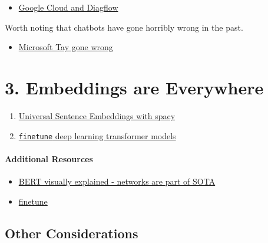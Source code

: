 \documentclass[
]{article}
\providecommand{\tightlist}{%
  \setlength{\itemsep}{0pt}\setlength{\parskip}{0pt}}
\begin{document}
\begin{itemize}
\tightlist
\item
  \href{https://developers.google.com/learn/topics/chatbots}{Google
  Cloud and Diagflow}
\end{itemize}

Worth noting that chatbots have gone horribly wrong in the past.

\begin{itemize}
\tightlist
\item
  \href{https://spectrum.ieee.org/in-2016-microsofts-racist-chatbot-revealed-the-dangers-of-online-conversation}{Microsoft
  Tay gone wrong}
\end{itemize}

\hypertarget{embeddings-are-everywhere}{%
\section{3. Embeddings are Everywhere}\label{embeddings-are-everywhere}}

\begin{enumerate}
\def\labelenumi{\arabic{enumi}.}
\item
  \href{https://colab.research.google.com/drive/1Uvdr09Aitq4IQHTj5Yb-WkoUWE4g_d5X?usp=sharing}{Universal
  Sentence Embeddings with spacy}
\item
  \href{https://colab.research.google.com/drive/1jXd2VZdDjudEj25Ij7-E7N2Qa5IghHQ8?usp=sharing}{\texttt{finetune}
  deep learning transformer models}
\end{enumerate}

\hypertarget{additional-resources}{%
\paragraph{Additional Resources}\label{additional-resources}}

\begin{itemize}
\tightlist
\item
  \href{https://jalammar.github.io/illustrated-bert/}{BERT visually
  explained - networks are part of SOTA}
\item
  \href{https://github.com/IndicoDataSolutions/finetune}{finetune}
\end{itemize}

\hypertarget{other-considerations}{%
\subsection{Other Considerations}\label{other-considerations}}
\end{document}
